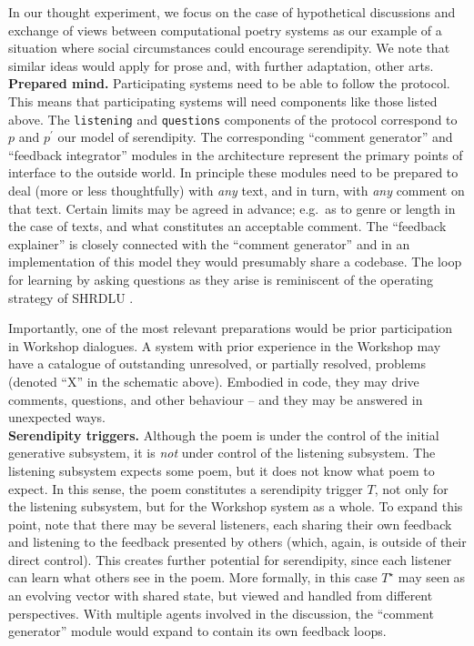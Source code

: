 In our thought experiment, we focus on the case of
hypothetical discussions and exchange of views between computational
poetry systems as our example of a situation where social
circumstances could encourage serendipity. We note that similar ideas
would apply for prose and, with further adaptation, other arts.\\

\noindent \textbf{Prepared mind.}
Participating systems need to be able to follow the protocol.  This
means that participating systems will need components like those
listed above. The {\tt listening} and {\tt questions} components of
the protocol correspond to $p$ and $p^{\prime}$ our model of
serendipity.  The corresponding ``comment generator'' and ``feedback
integrator'' modules in the architecture represent the primary points
of interface to the outside world.  In principle these modules need to
be prepared to deal (more or less thoughtfully) with \emph{any} text,
and in turn, with \emph{any} comment on that text.  Certain limits may
be agreed in advance; e.g.~as to genre or length in the case of texts,
and what constitutes an acceptable comment.  The ``feedback
explainer'' is closely connected with the ``comment generator'' and in
an implementation of this model they would presumably share a
codebase.  The loop for learning by asking questions as they arise is
reminiscent of the operating strategy of {\sf SHRDLU}
\cite{winograd1972understanding}.

Importantly, one of the most relevant preparations would be prior
participation in Workshop dialogues.  A system with prior experience
in the Workshop may have a catalogue of outstanding unresolved, or
partially resolved, problems (denoted ``X'' in the schematic above).
Embodied in code, they may drive comments, questions, and other
behaviour -- and they may be answered in unexpected ways.\\

\noindent \textbf{Serendipity triggers.}
Although the poem is under the control of the initial generative
subsystem, it is \emph{not} under control of the listening subsystem.
The listening subsystem expects some poem, but it does not know what
poem to expect.  In this sense, the poem constitutes a serendipity
trigger $T$, not only for the listening subsystem, but for the
Workshop system as a whole.
%
To expand this point, note that there may be several listeners, each
sharing their own feedback and listening to the feedback presented by
others (which, again, is outside of their direct control).  This
creates further potential for serendipity, since each listener can
learn what others see in the poem.  More formally, in this case
$T^\star$ may seen as an evolving vector with shared state, but viewed
and handled from different perspectives.  With multiple agents
involved in the discussion, the ``comment generator'' module would
expand to contain its own feedback loops.\\


